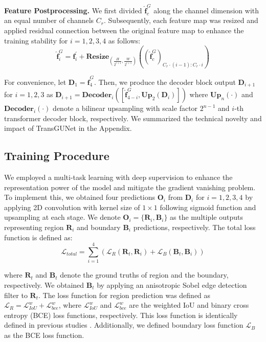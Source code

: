 \noindent \textbf{Feature Postprocessing.} We first divided $\hat{\mathbf{f}}^{G}_{c}$ along the channel dimension with an equal number of channels $C_{r}$. Subsequently, each feature map was resized and applied residual connection between the original feature map to enhance the training stability for $i = 1, 2, 3, 4$ as follows:
\begin{equation}
    \hat{\mathbf{f}}^{G}_{i} = \mathbf{f}^{'}_{i} + \textbf{Resize}_{(\frac{H}{2^{i + 1}}, \frac{W}{2^{i + 1}})} \left( (\hat{\mathbf{f}}^{G}_{c})_{C_{r} \cdot (i - 1):C_{r} \cdot i} \right)
\end{equation}

\noindent For convenience, let $\mathbf{D}_{1} = \hat{\mathbf{f}}^{G}_{4}$. Then, we produce the decoder block output $\mathbf{D}_{i + 1}$ for $i = 1, 2, 3$ as $\mathbf{D}_{i + 1} = \textbf{Decoder}_{i} \left( \left[ \hat{\mathbf{f}}^{G}_{4 - i}, \textbf{Up}_{2} ( \mathbf{D}_{i} ) \right] \right)$ where $\textbf{Up}_{n} ( \cdot )$ and $\textbf{Decoder}_{i} ( \cdot )$ denote a bilinear upsampling with scale factor $2^{n - 1}$ and $i$-th transformer decoder block, respectively. We summarized the technical novelty and impact of TransGUNet in the Appendix.

\subsection{Training Procedure}
We employed a multi-task learning with deep supervision to enhance the representation power of the model and mitigate the gradient vanishing problem. To implement this, we obtained four predictions $\mathbf{O}_{i}$ from $\mathbf{D}_{i}$ for $i = 1, 2, 3, 4$ by applying 2D convolution with kernel size of $1 \times 1$ following sigmoid function and upsampling at each stage. We denote $\mathbf{O}_{i} = \{ \mathbf{R}_{i}, \mathbf{B}_{i} \}$ as the multiple outputs representing region $\mathbf{R}_{i}$ and boundary $\mathbf{B}_{i}$ predictions, respectively. The total loss function is defined as:
\begin{equation}
    \mathcal{L}_{total} = \sum_{i=1}^{4} \left( \mathcal{L}_{R} (\mathbf{R}_{t}, \mathbf{R}_{i}) + \mathcal{L}_{B} (\mathbf{B}_{t}, \mathbf{B}_{i}) \right)  
\end{equation}

\noindent where $\mathbf{R}_{t}$ and $\mathbf{B}_{t}$ denote the ground truths of region and the boundary, respectively. We obtained $\mathbf{B}_{t}$  by applying an anisotropic Sobel edge detection filter \cite{kanopoulos1988design} to $\mathbf{R}_{t}$. The loss function for region prediction was defined as $\mathcal{L}_{R} = \mathcal{L}^{w}_{IoU} + \mathcal{L}^{w}_{bce}$, where $\mathcal{L}^{w}_{IoU}$ and $\mathcal{L}^{w}_{bce}$ are the weighted IoU and binary cross entropy (BCE) loss functions, respectively. This loss function is identically defined in previous studies \cite{fan2020pranet, zhao2023m, nam2024modality}. Additionally, we defined boundary loss function $\mathcal{L}_{B}$ as the BCE loss function. 

